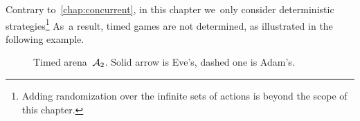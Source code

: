 

Contrary to~\cref{chap:concurrent}, in this chapter we~only consider
deterministic strategies\footnote{Adding randomization over the
  infinite sets of actions is beyond the scope of this chapter.}
  As~a result, timed games are not
determined, as illustrated in the following example.

\begin{figure}[ht]
  \centering
  \caption{Timed arena~$\mathcal{A}_2$. Solid arrow is Eve's, dashed one is Adam's.}
  \label{10-fig:ta2}
\end{figure}




